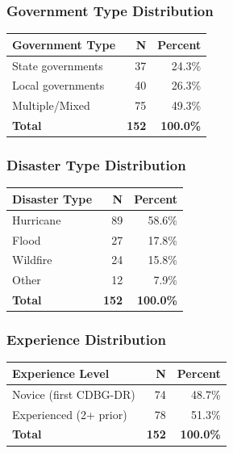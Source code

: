 \documentclass[
  12pt,
  letterpaper,
]{article}
\begin{document}
\subsubsection{Government Type
Distribution}\label{government-type-distribution}

\begin{longtable}[]{@{}lrr@{}}
\toprule\noalign{}
\textbf{Government Type} & \textbf{N} & \textbf{Percent} \\
\midrule\noalign{}
\endhead
\bottomrule\noalign{}
\endlastfoot
State governments & 37 & 24.3\% \\
Local governments & 40 & 26.3\% \\
Multiple/Mixed & 75 & 49.3\% \\
\textbf{Total} & \textbf{152} & \textbf{100.0\%} \\
\end{longtable}

\subsubsection{Disaster Type
Distribution}\label{disaster-type-distribution}

\begin{longtable}[]{@{}lrr@{}}
\toprule\noalign{}
\textbf{Disaster Type} & \textbf{N} & \textbf{Percent} \\
\midrule\noalign{}
\endhead
\bottomrule\noalign{}
\endlastfoot
Hurricane & 89 & 58.6\% \\
Flood & 27 & 17.8\% \\
Wildfire & 24 & 15.8\% \\
Other & 12 & 7.9\% \\
\textbf{Total} & \textbf{152} & \textbf{100.0\%} \\
\end{longtable}

\subsubsection{Experience Distribution}\label{experience-distribution}

\begin{longtable}[]{@{}lrr@{}}
\toprule\noalign{}
\textbf{Experience Level} & \textbf{N} & \textbf{Percent} \\
\midrule\noalign{}
\endhead
\bottomrule\noalign{}
\endlastfoot
Novice (first CDBG-DR) & 74 & 48.7\% \\
Experienced (2+ prior) & 78 & 51.3\% \\
\textbf{Total} & \textbf{152} & \textbf{100.0\%} \\
\end{longtable}
\end{document}
